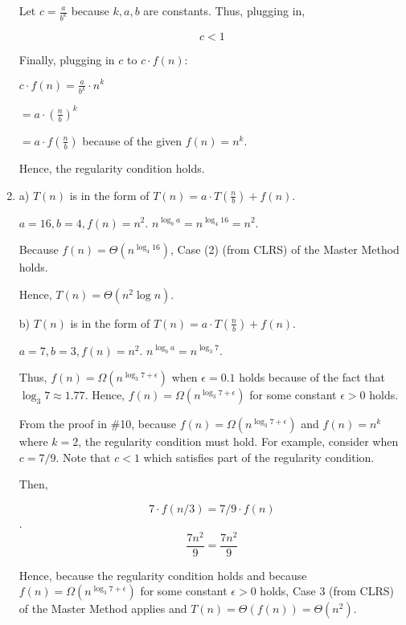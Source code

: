 \documentclass[a4paper]{report}
\begin{document}
\begin{enumerate}
        Let $c = \frac{a}{b^k}$ because $k, a, b$ are constants.  Thus, plugging in,

        $$ c < 1 $$

        Finally, plugging in $c$ to $c \cdot f(n)$:

        $c \cdot f(n) = \frac{a}{b^k} \cdot n^k$

        $             = a \cdot (\frac{n}{b})^k$

        $             = a \cdot f(\frac{n}{b})$
        because of the given $f(n) = n^k$.

        Hence, the regularity condition holds. 

    \pagebreak
    \par
    \bigskip

    \item

      a) 
      $T(n)$ is in the form of $T(n) = a \cdot T(\frac{n}{b}) + f(n)$.

      $a = 16, b = 4, f(n) = n^2$. $n^{\log_b a} = n^{\log_4 16} = n^2$. 

      Because $f(n) = \Theta(n^{\log_4 16})$, Case (2) (from CLRS) of the Master Method holds. 

      Hence, $T(n) = \Theta(n^2 \log n)$. 


      \bigskip

      b) 
      $T(n)$ is in the form of $T(n) = a \cdot T(\frac{n}{b}) + f(n)$.

      $a = 7, b = 3, f(n) = n^2$. $n^{\log_b a} = n^{\log_3 7}$. 

      Thus, $f(n) = \Omega(n^{\log_3 7 + \epsilon})$ when $\epsilon=0.1$ holds because of the fact that
      $\log_3 7 \approx 1.77$. Hence, $f(n) = \Omega(n^{\log_3 7 + \epsilon})$ for some constant $\epsilon>0$ holds.

      From the proof in \#10, because $f(n) = \Omega(n^{\log_3 7 + \epsilon})$ and $f(n) = n^k$ where $k=2$,
      the regularity condition must hold. For example, consider when $c = 7/9$. Note that $c < 1$ which satisfies part of the
      regularity condition. 
      
      Then,
      
      $$7 \cdot f(n/3) = 7/9 \cdot f(n)$$.
      $$\frac{7 n^2}{9}= \frac{7 n^2}{9}$$ 

      Hence, because the regularity condition holds and because $f(n) = \Omega(n^{\log_3 7 + \epsilon})$ for some constant $\epsilon>0$ holds,
      Case 3 (from CLRS) of the Master Method applies and $T(n) = \Theta(f(n)) = \Theta(n^2)$.


\end{enumerate}
\end{document}

